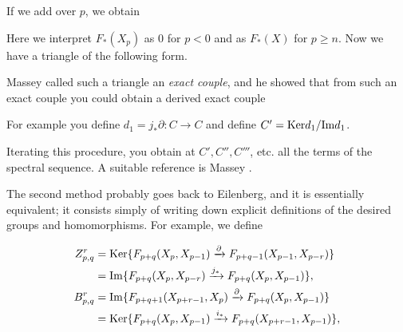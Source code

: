 \documentclass[../main]{subfiles}
\begin{document}
If we add over $p$, we obtain

\begin{center}
\end{center}

Here we interpret $F_{\ast}(X_p)$ as $0$ for $p<0$ and as $F_{\ast}(X)$ for $p\geq n$. Now we have a triangle of the following form.

\begin{center}
\end{center}

Massey called such a triangle an \emph{exact couple}, and he showed that from such an exact couple you could obtain a derived exact couple

\begin{center}
\end{center}

For example you define $d_1=j_{\ast}\partial\colon C\longrightarrow C$ and define $C'=\mathrm{Ker} d_1/\mathrm{Im} d_1$.

Iterating this procedure, you obtain at $C',C'',C'''$, etc. all the terms of the spectral sequence. A suitable reference is Massey \cite{massey}.

The second method probably goes back to Eilenberg, and it is essentially equivalent; it consists simply of writing down explicit definitions of the desired groups and homomorphisms. For example, we define


\begin{align*}
    Z_{p,q}^r&=\mathrm{Ker}\{F_{p+q}(X_p,X_{p-1})\xrightarrow{\partial}F_{p+q-1}(X_{p-1},X_{p-r})\}\\
    &=\mathrm{Im}\{F_{p+q}(X_p,X_{p-r})\xrightarrow{j_{\ast}}F_{p+q}(X_p,X_{p-1})\},\\
    B_{p,q}^r&=\mathrm{Im}\{F_{p+q+1}(X_{p+r-1},X_p)\xrightarrow{\partial}F_{p+q}(X_p,X_{p-1})\}\\
    &=\mathrm{Ker}\{F_{p+q}(X_p,X_{p-1})\xrightarrow{i_{\ast}}F_{p+q}(X_{p+r-1},X_{p-1})\},
\end{align*}
\end{document}
